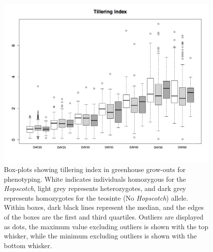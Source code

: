 \documentclass[11pt]{article} %
\begin{document}
\begin{linenumbers}
\begin{flushleft}
\begin{figure}[!t]
  \begin{center}
   \includegraphics[width=160mm]{Figure5BoxplotPheno1.png}
   \end{center}
    \caption{Box-plots showing tillering index in greenhouse grow-outs for phenotyping. White indicates individuals homozygous for the \emph{Hopscotch}, light grey represents heterozygotes, and dark grey represents homozygotes for the teosinte (No \emph{Hopscotch}) allele. Within boxes, dark black lines represent the median, and the edges of the boxes are the first and third quartiles. Outliers are displayed as dots, the maximum value excluding outliers is shown with the top whisker, while the minimum excluding outliers is shown with the bottom whisker.}
\label{Fig5Boxplots}
\end{figure}


\end{flushleft}

\end{linenumbers}
\end{document}
